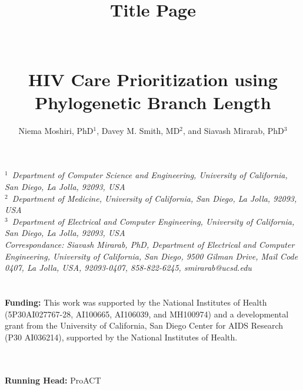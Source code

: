 \documentclass[a4paper,11pt]{article}
\begin{document}
\title{\textbf{Title Page}\\~\\~\\HIV Care Prioritization using Phylogenetic Branch Length}

\author{Niema Moshiri, PhD$^{1}$, Davey M. Smith, MD$^{2}$, and
Siavash Mirarab, PhD$^{3}$\\[4pt]}
\date{}

\maketitle

\textit{$^{1}$~Department of Computer Science and Engineering, University of California, San Diego, La Jolla, 92093, USA}
\\
\textit{$^{2}$~Department of Medicine, University of California, San Diego, La Jolla, 92093, USA}
\\
\textit{$^{3}$~Department of Electrical and Computer Engineering, University of California, San Diego, La Jolla, 92093, USA}
\\[2pt]

\textit{Correspondance: Siavash Mirarab, PhD, Department of Electrical and Computer Engineering, University of California, San Diego, 9500 Gilman Drive, Mail Code 0407, La Jolla, USA, 92093-0407, 858-822-6245, smirarab@ucsd.edu}\\~\\~\\


{\bf Funding: }
This work was supported by the National Institutes of Health (5P30AI027767-28, AI100665, AI106039, and MH100974) and a developmental grant from the University of California, San Diego Center for AIDS Research (P30 AI036214), supported by the National Institutes of Health.

~\\~\\

\textbf{Running Head:} ProACT

\pagebreak
\end{document}
